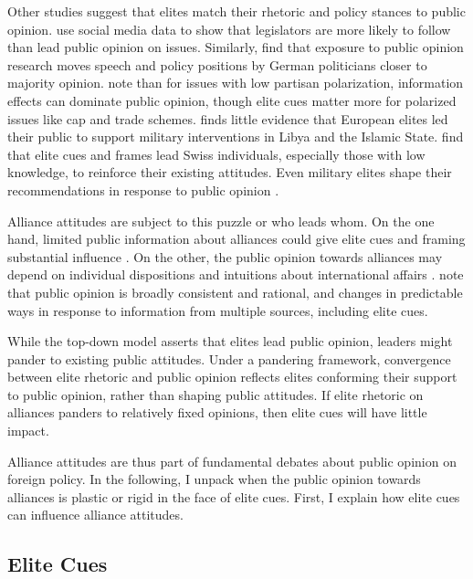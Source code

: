 \documentclass[12pt]{article}
\begin{document}
Other studies suggest that elites match their rhetoric and policy stances to public opinion. 
\citet{Barberaetal2019} use social media data to show that legislators are more likely to follow than lead public opinion on issues. 
Similarly, \citet{HagerHilbig2020} find that exposure to public opinion research moves speech and policy positions by German politicians closer to majority opinion. 
\citet{GuisingerSaunders2017} note than for issues with low partisan polarization, information effects can dominate public opinion, though elite cues matter more for polarized issues like cap and trade schemes. 
\citet{Haesebrouck2019} finds little evidence that European elites led their public to support military interventions in Libya and the Islamic State. 
\citet{Bechteletal2015} find that elite cues and frames lead Swiss individuals, especially those with low knowledge, to reinforce their existing attitudes. 
Even military elites shape their recommendations in response to public opinion \citep{LinGreenberg2021}. 



Alliance attitudes are subject to this puzzle or who leads whom. 
On the one hand, limited public information about alliances could give elite cues and framing substantial influence \citep{Druckman2001}. 
On the other, the public opinion towards alliances may depend on individual dispositions and intuitions about international affairs \citep{Herrmannetal2009, KertzerZeitzoff2017}.
\citet{PageShapiro1992} note that public opinion is broadly consistent and rational, and changes in predictable ways in response to information from multiple sources, including elite cues. 

 
While the top-down model asserts that elites lead public opinion, leaders might pander to existing public attitudes.
Under a pandering framework, convergence between elite rhetoric and public opinion reflects elites conforming their support to public opinion, rather than shaping public attitudes. 
If elite rhetoric on alliances panders to relatively fixed opinions, then elite cues will have little impact.


Alliance attitudes are thus part of fundamental debates about public opinion on foreign policy.  
In the following, I unpack when the public opinion towards alliances is plastic or rigid in the face of elite cues.  
First, I explain how elite cues can influence alliance attitudes. 


\subsection{Elite Cues} 
\end{document}

